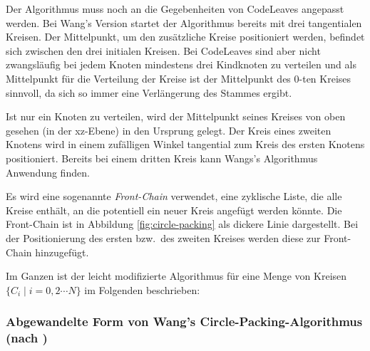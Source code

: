 Der Algorithmus muss noch an die Gegebenheiten von CodeLeaves angepasst werden. Bei Wang's Version startet der Algorithmus bereits mit drei tangentialen Kreisen. Der Mittelpunkt, um den zusätzliche Kreise positioniert werden, befindet sich zwischen den drei initialen Kreisen. Bei CodeLeaves sind aber nicht zwangsläufig bei jedem Knoten mindestens drei Kindknoten zu verteilen und als Mittelpunkt für die Verteilung der Kreise ist der Mittelpunkt des $0$-ten Kreises sinnvoll, da sich so immer eine Verlängerung des Stammes ergibt.

Ist nur ein Knoten zu verteilen, wird der Mittelpunkt seines Kreises von oben gesehen (in der xz-Ebene) in den Ursprung gelegt. Der Kreis eines zweiten Knotens wird in einem zufälligen Winkel tangential zum Kreis des ersten Knotens positioniert. Bereits bei einem dritten Kreis kann Wangs's Algorithmus Anwendung finden.

Es wird eine sogenannte \textit{Front-Chain} verwendet, eine zyklische Liste, die alle Kreise enthält, an die potentiell ein neuer Kreis angefügt werden könnte. Die Front-Chain ist in Abbildung \ref{fig:circle-packing} als dickere Linie dargestellt. Bei der Positionierung des ersten bzw.\ des zweiten Kreises werden diese zur Front-Chain hinzugefügt.

Im Ganzen ist der leicht modifizierte Algorithmus für eine Menge von Kreisen $\lbrace C_i \mid i = 0, 2 \cdots N \rbrace$ im Folgenden beschrieben:

\subsubsection*{Abgewandelte Form von Wang's Circle-Packing-Algorithmus (nach \cite{wang2006visualization})}

